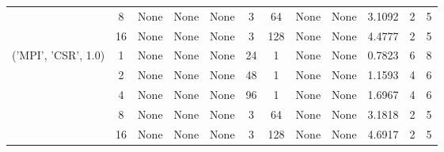\begin{tabular}{cccccccccccc}
& 8& None& None& None& 3& 64& None& None& 3.1092& 2& 5\\
& 16& None& None& None& 3& 128& None& None& 4.4777& 2& 5\\
\hline
\multirow{5}{*}{('MPI', 'CSR', 1.0)}& 1& None& None& None& 24& 1& None& None& 0.7823& 6& 8\\
& 2& None& None& None& 48& 1& None& None& 1.1593& 4& 6\\
& 4& None& None& None& 96& 1& None& None& 1.6967& 4& 6\\
& 8& None& None& None& 3& 64& None& None& 3.1818& 2& 5\\
& 16& None& None& None& 3& 128& None& None& 4.6917& 2& 5\\
\hline
\end{tabular}
